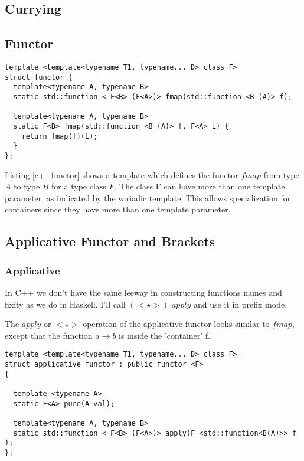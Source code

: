 \documentclass[12pt,fleqn]{article}
\begin{document}
%
\subsection{Currying}
%
%
%


\subsection{Functor}
%
\begin{minipage}{\linewidth}
\begin{lstlisting}[caption=functor in C++, label=c++functor]
template <template<typename T1, typename... D> class F>
struct functor {
  template<typename A, typename B>
  static std::function < F<B> (F<A>)> fmap(std::function <B (A)> f);

  template<typename A, typename B>
  static F<B> fmap(std::function <B (A)> f, F<A> L) {
    return fmap(f)(L);
  }
};
\end{lstlisting}
\end{minipage}
%
%
%
Listing \ref{c++functor} shows a template which defines the functor $fmap$ from type $A$ to type $B$ for a type class $F$. 
The class F can have more than one template parameter, as indicated by the variadic template.
This allows specialization for containers since they have more than one template parameter.


%
%
\subsection{Applicative Functor and Brackets}
%
%
%
\subsubsection{Applicative}
%
%
In C++ we don't have the same leeway in  constructing functions names and fixity as we do in Haskell.
I'll call $(<\star>)$ $apply$ and use it in prefix mode.

The $apply$ or $<\star>$ operation of the applicative functor looks similar to $fmap$, except that the function $a \rightarrow b$ is inside the 'container' f.


%
%
%
\begin{minipage}{\linewidth}
\begin{lstlisting}[caption=applicative functor template in C++, label=apf_temp]
template <template<typename T1, typename... D> class F> 
struct applicative_functor : public functor <F>
{

  template <typename A> 
  static F<A> pure(A val);

  template<typename A, typename B>
  static std::function < F<B> (F<A>)> apply(F <std::function<B(A)>> f );
};
\end{lstlisting}
\end{minipage}
%
%
%
\end{document}
